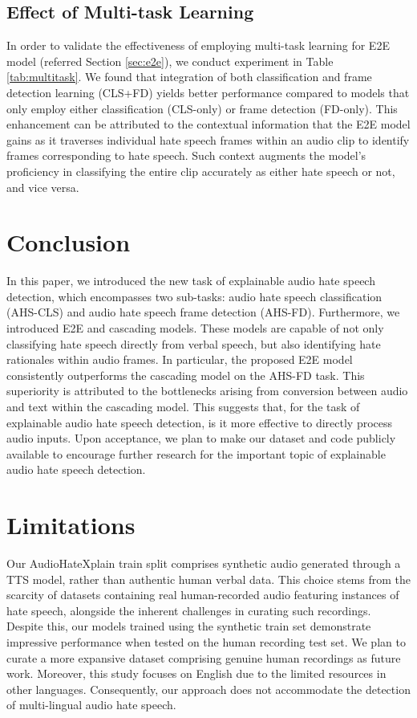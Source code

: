 \documentclass[11pt]{article}
\begin{document}
\subsection{Effect of Multi-task Learning}
In order to validate the effectiveness of employing multi-task learning for E2E model (referred Section \ref{sec:e2e}), we conduct experiment in Table \ref{tab:multitask}. We found that integration of both classification and frame detection learning (CLS+FD) yields better performance compared to models that only employ either classification (CLS-only) or frame detection (FD-only). This enhancement can be attributed to the contextual information that the E2E model gains as it traverses individual hate speech frames within an audio clip to identify frames corresponding to hate speech. Such context augments the model's proficiency in classifying the entire clip accurately as either hate speech or not, and vice versa.




\section{Conclusion}
In this paper, we introduced the new task of explainable audio hate speech detection, which encompasses two sub-tasks: audio hate speech classification (AHS-CLS) and audio hate speech frame detection (AHS-FD). Furthermore, we introduced E2E and cascading models. These models are capable of not only classifying hate speech directly from verbal speech, but also identifying hate rationales within audio frames.
In particular, the proposed E2E model consistently outperforms the cascading model on the AHS-FD task. This superiority is attributed to the bottlenecks arising from conversion between audio and text within the cascading model. This suggests that, for the task of explainable audio hate speech detection, is it more effective to directly process audio inputs. Upon acceptance, we plan to make our dataset and code publicly available to encourage further research for the important topic of explainable audio hate speech detection.

\newpage
\section*{Limitations}
Our  AudioHateXplain train split comprises synthetic audio generated through a TTS model, rather than authentic human verbal data. This choice stems from the scarcity of datasets containing real human-recorded audio featuring instances of hate speech, alongside the inherent challenges in curating such recordings. Despite this, our models trained using the synthetic train set demonstrate impressive performance when tested on the human recording test set. We plan to curate a more expansive dataset comprising genuine human recordings as future work. Moreover, this study focuses on English due to the limited resources in other languages. Consequently, our approach does not accommodate the detection of multi-lingual audio hate speech.
\end{document}
